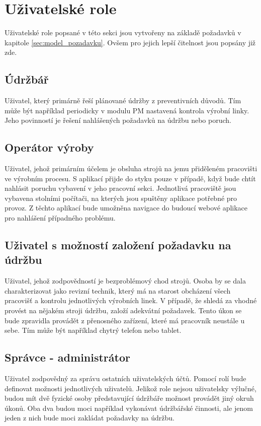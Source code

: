 \documentclass[thesis=M,czech]{FITthesis}[2012/06/26]
\begin{document}
\section{Uživatelské role}
\label{sec:role}
Uživatelské role popsané v této sekci jsou vytvořeny na základě požadavků v kapitole \ref{sec:model_pozadavku}. Ovšem pro jejich lepší čitelnost jsou popsány již zde. 
\subsection{Údržbář}
\label{ssec:udrzbar}
Uživatel, který primárně řeší plánované údržby z preventivních důvodů. Tím může být například periodicky v modulu PM nastavená kontrola výrobní linky. Jeho povinností je řešení nahlášených požadavků na údržbu nebo poruch.
\subsection{Operátor výroby}
\label{ssec:operator_vyroby}
Uživatel, jehož primárním účelem je obsluha strojů na jemu přiděleném pracovišti ve výrobním procesu. S aplikací přijde do styku pouze v případě, když bude chtít nahlásit poruchu vybavení v jeho pracovní sekci. Jednotlivá pracoviště jsou vybavena stolními počítači, na kterých jsou spuštěny aplikace potřebné pro provoz. Z těchto aplikací bude umožněna navigace do budoucí webové aplikace pro nahlášení případného problému.
\subsection{Uživatel s možností založení požadavku na údržbu}
\label{ssec:pozadavek_udrzba}
Uživatel, jehož zodpovědností je bezproblémový chod strojů. Osoba by se dala charakterizovat jako revizní technik, který má na starost obcházení všech pracovišť a kontrolu jednotlivých výrobních linek. V případě, že shledá za vhodné provést na nějakém stroji údržbu, založí adekvátní požadavek. Tento úkon se bude zpravidla provádět z přenosného zařízení, které má pracovník neustále u sebe. Tím může být například chytrý telefon nebo tablet.
\subsection{Správce - administrátor}
\label{ssec:administrator}
Uživatel zodpovědný za správu ostatních uživatelských účtů. Pomocí rolí bude definovat možnosti jednotlivých uživatelů. Jelikož role nejsou uživatelsky výlučné, budou mít dvě fyzické osoby představující údržbáře možnost provádět jiný okruh úkonů. Oba dva budou moci například vykonávat údržbářské činnosti, ale jenom jeden z nich bude moci zakládat požadavky na údržbu.
\end{document}
